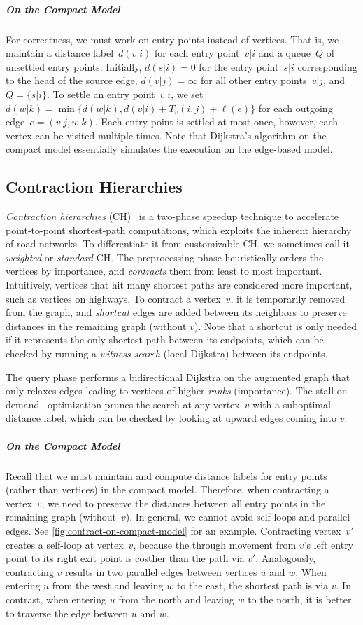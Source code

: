 \documentclass[a4paper, english, cleveref]{lipics-v2021}
\begin{document}
\subparagraph*{On the Compact Model}

For correctness, we must work on entry points instead of vertices. That is, we maintain a distance label~$d(v|i)$ for each entry point~$v|i$ and a queue~$Q$ of unsettled entry points. Initially, $d(s|i) = 0$ for the entry point~$s|i$ corresponding to the head of the source edge, $d(v|j) = \infty$ for all other entry points~$v|j$, and $Q = \{s|i\}$. To settle an entry point~$v|i$, we set $d(w|k) = \min\{d(w|k), d(v|i) + T_v(i, j) + \ell(e)\}$ for each outgoing edge~$e = (v|j, w|k)$. Each entry point is settled at most once, however, each vertex can be visited multiple times. Note that Dijkstra's algorithm on the compact model essentially simulates the execution on the edge-based model.

\subsection{Contraction Hierarchies}

\emph{Contraction hierarchies} (CH)~\cite{GeisbergerSSV12} is a two-phase speedup technique to accelerate point-to-point shortest-path computations, which exploits the inherent hierarchy of road networks. To differentiate it from customizable CH, we sometimes call it \emph{weighted} or \emph{standard} CH. The preprocessing phase heuristically orders the vertices by importance, and \emph{contracts} them from least to most important. Intuitively, vertices that hit many shortest paths are considered more important, such as vertices on highways. To contract a vertex~$v$, it is temporarily removed from the graph, and \emph{shortcut} edges are added between its neighbors to preserve distances in the remaining graph (without $v$). Note that a shortcut is only needed if it represents the only shortest path between its endpoints, which can be checked by running a \emph{witness search} (local Dijkstra) between its endpoints.

The query phase performs a bidirectional Dijkstra on the augmented graph that only relaxes edges leading to vertices of higher \emph{ranks} (importance). The stall-on-demand~\cite{GeisbergerSSV12} optimization prunes the search at any vertex~$v$ with a suboptimal distance label, which can be checked by looking at upward edges coming into $v$.

\subparagraph*{On the Compact Model}

Recall that we must maintain and compute distance labels for entry points (rather than vertices) in the compact model. Therefore, when contracting a vertex~$v$, we need to preserve the distances between all entry points in the remaining graph (without~$v$). In general, we cannot avoid self-loops and parallel edges. See \cref{fig:contract-on-compact-model} for an example. Contracting vertex~$v'$ creates a self-loop at vertex~$v$, because the through movement from $v$'s left entry point to its right exit point is costlier than the path via $v'$. Analogously, contracting $v$ results in two parallel edges between vertices $u$ and $w$. When entering $u$ from the west and leaving $w$ to the east, the shortest path is via $v$. In contrast, when entering $u$ from the north and leaving $w$ to the north, it is better to traverse the edge between $u$ and $w$.
\end{document}
